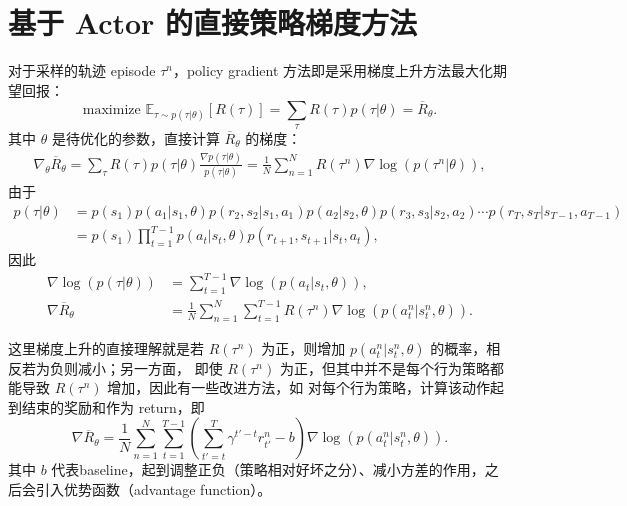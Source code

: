 \section{基于 Actor 的直接策略梯度方法}
对于采样的轨迹 episode $\tau^{n}$，policy gradient 方法即是采用梯度上升方法最大化期望回报：
\begin{equation}
    \text{maximize }\mathbb{E}_{\tau\sim p(\tau|\theta)}[R(\tau)] = \sum_{\tau} R(\tau)p(\tau|\theta)
    =\overline{R}_\theta.
\end{equation}
其中 $\theta$ 是待优化的参数，直接计算 $\overline{R}_\theta$ 的梯度：
\begin{align}
    \nabla_\theta\overline{R}_\theta = \sum_{\tau}R(\tau)p(\tau|\theta)\frac{\nabla p(\tau|\theta)}{p(\tau|\theta)}
    = \frac{1}{N}\sum_{n=1}^{N} R(\tau^{n})\nabla\log (p(\tau^{n}|\theta)), 
\end{align}
由于
\begin{align}
    p(\tau|\theta) &= p(s_1)p(a_1|s_1,\theta)p(r_2,s_2|s_1,a_1)p(a_2|s_2,\theta)p(r_3,s_3|s_2,a_2) \cdots p(r_T,s_T|s_{T-1},a_{T-1})\\
    &=p(s_1)\prod_{t=1}^{T-1}p(a_t|s_t,\theta)p(r_{t+1},s_{t+1}|s_t,a_t),
\end{align}
因此
\begin{align}
    \nabla \log (p(\tau|\theta)) &= \sum_{t=1}^{T-1} \nabla \log(p(a_t|s_t,\theta)),\\
    \nabla \overline{R}_\theta &= \frac{1}{N}\sum_{n=1}^{N}\sum_{t=1}^{T-1}R(\tau^{n}) \nabla \log(p(a_t^n|s_t^n,\theta)).
\end{align}

这里梯度上升的直接理解就是若 $R(\tau^n)$ 为正，则增加 $p(a_t^n|s_t^n,\theta)$ 的概率，相反若为负则减小；另一方面，
即使 $R(\tau^n)$ 为正，但其中并不是每个行为策略都能导致 $R(\tau^n)$ 增加，因此有一些改进方法，如
对每个行为策略，计算该动作起到结束的奖励和作为 return，即
\begin{equation}\label{eq:actor gradient}
    \nabla \overline{R}_\theta = \frac{1}{N}\sum_{n=1}^{N}\sum_{t=1}^{T-1}(\sum_{t'=t}^{T}\gamma^{t'-t}r_{t'}^n-b) \nabla \log(p(a_t^n|s_t^n,\theta)).
\end{equation}
其中 $b$ 代表baseline，起到调整正负（策略相对好坏之分）、减小方差的作用，之后会引入优势函数（advantage function）。


